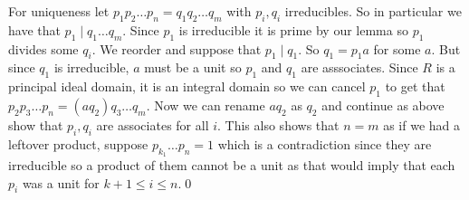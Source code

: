\documentclass{article}
\begin{document}
\begin{itemize}
For uniqueness let $ p_1p_2\dots p_n=q_1q_2\dots q_m $ with $ p_i,q_i $ irreducibles. So in particular we have that $ p_1\mid q_1\dots q_m $. Since $ p_1 $ is irreducible it is prime by our lemma so $ p_1 $ divides some $ q_i $. We reorder and suppose that $ p_1\mid q_1 $. So $ q_1=p_1a $ for some $ a $. But since $ q_1 $ is irreducible, $ a $ must be a unit so $ p_1 $ and $ q_1 $ are asssociates. Since $ R $ is a principal ideal domain, it is an integral domain so we can cancel $ p_1 $ to get that $ p_2p_3\dots p_n=(aq_2)q_3\dots q_m $. Now we can rename $ aq_2 $ as $ q_2 $ and continue as above show that $ p_i, q_i $ are associates for all $ i $. This also shows that $ n=m $ as if we had a leftover product, suppose $ p_{k_1}\dots p_n = 1$ which is a contradiction since they are irreducible so a product of them cannot be a unit as that would imply that each $ p_i $ was a unit for $ k+1\le i \le n $.\qed


\end{itemize}
\end{document}
